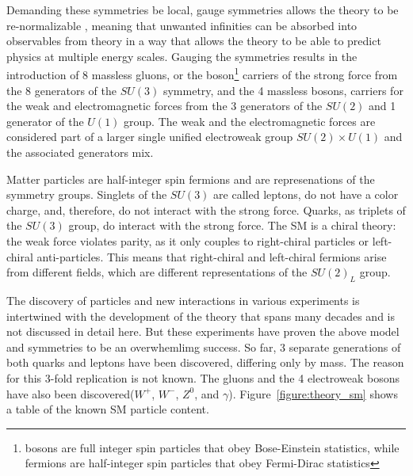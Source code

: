 Demanding these symmetries be local, gauge symmetries allows the theory to be
re-normalizable \cite{1972.tHooft-Veltman.regularization_and_renormalization}, meaning that unwanted infinities can be absorbed into
observables from theory in a way that allows the theory to be able to predict
physics at multiple energy scales.
Gauging the symmetries results in the introduction of 8 massless gluons, or the
boson\footnote{bosons are full integer spin particles that obey Bose-Einstein statistics, while fermions are half-integer spin particles that obey Fermi-Dirac statistics} carriers of the strong force \cite{1973.Gross-Wilczek.Asymptotic_freedom_0} from the 8 generators of the
$SU(3)$ symmetry, and the 4 massless bosons, carriers for the weak
and electromagnetic forces from the 3 generators of the $SU(2)$ and 1
generator of the $U(1)$ group. The weak and the electromagnetic forces are considered part of a larger single 
unified electroweak group $SU(2) \times U(1)$ and the associated generators mix. 

Matter particles are half-integer spin fermions and are represenations of the symmetry groups. Singlets of the $SU(3)$ 
are called leptons, do not have a color charge, and, therefore, do not interact with the strong force. Quarks,
as triplets of the $SU(3)$ group, do interact with the strong force. The SM is a chiral theory:
the weak force violates parity, as it only couples to right-chiral particles or left-chiral anti-particles. 
This means that right-chiral and left-chiral fermions arise from different fields, which are
different representations of the $SU(2)_L$ group.
 
The discovery of particles and new interactions in various experiments
is intertwined with the development of the theory that spans many
decades and is not discussed in detail here. But these
experiments have proven the above model and symmetries to be an overwhemlimg success.
So far, 3 separate generations of both quarks and leptons have been discovered, differing only by mass. The reason for this 3-fold replication is not known. The gluons and the 4 electroweak bosons have also been discovered($W^+$, $W^-$, $Z^0$, and $\gamma$). Figure~\ref{figure:theory_sm} shows a table of the known SM particle content.  


